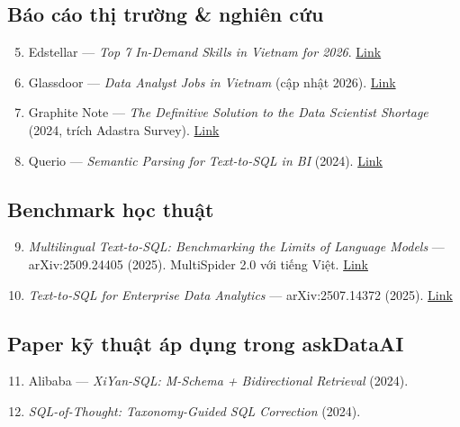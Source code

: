 \documentclass[11pt,a4paper]{article}
\begin{document}
\subsection*{Báo cáo thị trường \& nghiên cứu}
\begin{enumerate}\setcounter{enumi}{4}
\item Edstellar --- \textit{Top 7 In-Demand Skills in Vietnam for 2026}. \href{https://www.edstellar.com/blog/skills-in-demand-in-vietnam}{Link}
\item Glassdoor --- \textit{Data Analyst Jobs in Vietnam} (cập nhật 2026). \href{https://www.glassdoor.com/Job/vietnam-data-analyst-jobs-SRCH_IL.0,7_IN251_KO8,20.htm}{Link}
\item Graphite Note --- \textit{The Definitive Solution to the Data Scientist Shortage} (2024, trích Adastra Survey). \href{https://graphite-note.com/data-scientist-shortage/}{Link}
\item Querio --- \textit{Semantic Parsing for Text-to-SQL in BI} (2024). \href{https://querio.ai/articles/semantic-parsing-for-text-to-sql-in-bi}{Link}
\end{enumerate}

\subsection*{Benchmark học thuật}
\begin{enumerate}\setcounter{enumi}{8}
\item \textit{Multilingual Text-to-SQL: Benchmarking the Limits of Language Models} --- arXiv:2509.24405 (2025). MultiSpider 2.0 với tiếng Việt. \href{https://arxiv.org/html/2509.24405}{Link}
\item \textit{Text-to-SQL for Enterprise Data Analytics} --- arXiv:2507.14372 (2025). \href{https://arxiv.org/html/2507.14372v1}{Link}
\end{enumerate}

\subsection*{Paper kỹ thuật áp dụng trong askDataAI}
\begin{enumerate}\setcounter{enumi}{10}
\item Alibaba --- \textit{XiYan-SQL: M-Schema + Bidirectional Retrieval} (2024).
\item \textit{SQL-of-Thought: Taxonomy-Guided SQL Correction} (2024).
\end{enumerate}
\end{document}
